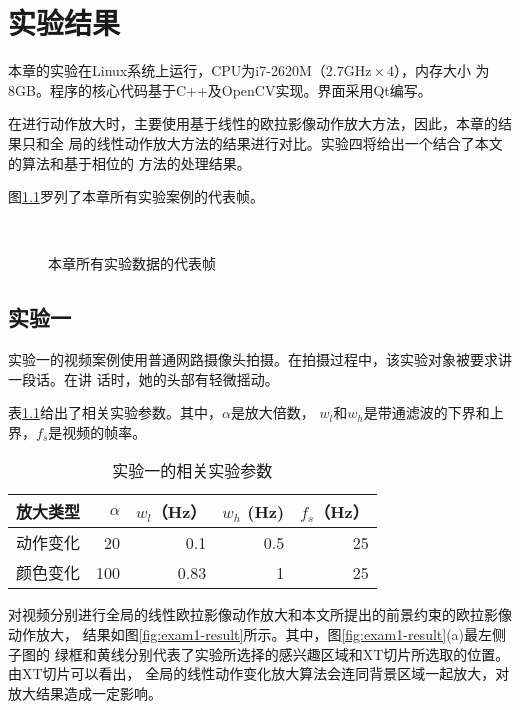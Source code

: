 \chapter{实验结果}
\label{chap:results}

本章的实验在Linux系统上运行，CPU为i7-2620M（$2.7\mbox{GHz}\times 4$），内存大小
为8GB。程序的核心代码基于C++及OpenCV实现。界面采用Qt编写。

在进行动作放大时，主要使用基于线性的欧拉影像动作放大方法，因此，本章的结果只和全
局的线性动作放大方法的结果进行对比。实验四将给出一个结合了本文的算法和基于相位的
方法的处理结果。

图\ref{fig:all-videos}罗列了本章所有实验案例的代表帧。

\begin{figure}[htbp]
  \centering
  \qquad
  \\
  \qquad
  \caption{本章所有实验数据的代表帧}
  \label{fig:all-videos}
\end{figure}

\section{实验一}
\label{sec:exam1}

实验一的视频案例使用普通网路摄像头拍摄。在拍摄过程中，该实验对象被要求讲一段话。在讲
话时，她的头部有轻微摇动。

表\ref{tab:exam1-data}给出了相关实验参数。其中，$\alpha$是放大倍数，
$w_l$和$w_h$是带通滤波的下界和上界，$f_s$是视频的帧率。

\begin{table}[htbp]
  \centering
  \caption{实验一的相关实验参数}
  \label{tab:exam1-data}
  \begin{tabular}[c]{crrrr}
    \toprule[1.5pt]
    放大类型 & $\alpha$ & $w_l$（Hz） & $w_h$ (Hz) & $f_s$（Hz）\\
    \midrule
    动作变化 & 20 & 0.1 & 0.5 & 25 \\
    颜色变化 & 100 & 0.83 & 1 & 25 \\
    \bottomrule[1.5pt]
  \end{tabular}
\end{table}

对视频分别进行全局的线性欧拉影像动作放大和本文所提出的前景约束的欧拉影像动作放大，
结果如图\ref{fig:exam1-result}所示。其中，图\ref{fig:exam1-result}(a)最左侧子图的
绿框和黄线分别代表了实验所选择的感兴趣区域和XT切片所选取的位置。由XT切片可以看出，
全局的线性动作变化放大算法会连同背景区域一起放大，对放大结果造成一定影响。

